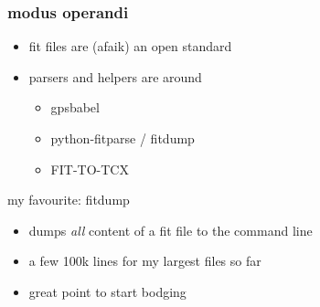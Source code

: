 \documentclass[table,xcolor=dvipsnames,professionalfonts]{beamer}
\begin{document}
\begin{frame}
\begin{columns}
\begin{column}{.5\textwidth}
    \end{column}
  \end{columns}
\end{frame}

\begin{frame}
  \frametitle{modus operandi}
  \begin{itemize}
    \item fit files are (afaik) an open standard
    \item parsers and helpers are around
      \begin{itemize}
        \item gpsbabel
        \item python-fitparse / fitdump
        \item FIT-TO-TCX
      \end{itemize}
  \end{itemize}
  \begin{exampleblock}{my favourite: fitdump}
    \begin{itemize}
      \item dumps \emph{all} content of a fit file to the command line
      \item a few 100k lines for my largest files so far
      \item great point to start bodging
    \end{itemize}
  \end{exampleblock}
\end{frame}
\end{document}
